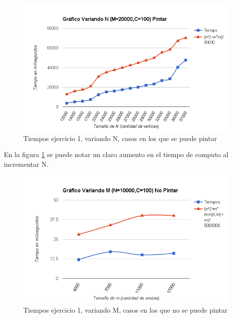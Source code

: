 \begin{figure}[H]
 \begin{center}
     \includegraphics[scale=0.6]{../Ejercicio1VariandoNPintar.png}
 \end{center}
 \caption{Tiempos ejercicio 1, variando N, casos en los que se puede pintar}
 \label{n}
\end{figure}

En la figura \ref{n} se puede notar un claro aumento en el tiempo de computo al incrementar N.





\begin{figure}[H]
 \begin{center}
     \includegraphics[scale=0.6]{../Ejercicio1VariandoMNoPintar.png}
 \end{center}
 \caption{Tiempos ejercicio 1, variando M, casos en los que no se puede pintar}
\end{figure}



